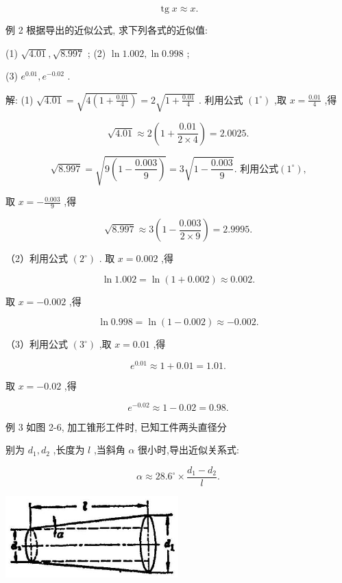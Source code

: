 \documentclass[10pt]{article}
\begin{document}
\[
\operatorname{tg}x \approx x\text{.}
\]

例 2 根据导出的近似公式, 求下列各式的近似值:

(1) \(\sqrt{4.01},\sqrt{8.997}\) ; (2) \(\ln {1.002},\ln {0.998}\) ;

(3) \({e}^{0.01},{e}^{-{0.02}}\) .

解: (1) \(\sqrt{4.01} = \sqrt{4\left( {1 + \frac{0.01}{4}}\right) } = 2\sqrt{1 + \frac{0.01}{4}}\) . 利用公式 \(\left( {1}^{ \circ }\right)\) ,取 \(x = \frac{0.01}{4}\) ,得

\[
\sqrt{4.01} \approx 2\left( {1 + \frac{0.01}{2 \times 4}}\right) = {2.0025}.
\]

\[
\sqrt{8.997} = \sqrt{9\left( {1 - \frac{0.003}{9}}\right) } = 3\sqrt{1 - \frac{0.003}{9}}\text{. 利用公式}\left( {1}^{ \circ }\right) \text{,}
\]

取 \(x = - \frac{0.003}{9}\) ,得

\[
\sqrt{8.997} \approx 3\left( {1 - \frac{0.003}{2 \times 9}}\right) = {2.9995}.
\]

（2）利用公式 \(\left( {2}^{ \circ }\right)\) . 取 \(x = {0.002}\) ,得

\[
\ln {1.002} = \ln \left( {1 + {0.002}}\right) \approx {0.002}\text{.}
\]

取 \(x = - {0.002}\) ,得

\[
\ln {0.998} = \ln \left( {1 - {0.002}}\right) \approx - {0.002}.
\]

（3）利用公式 \(\left( {3}^{ \circ }\right)\) ,取 \(x = {0.01}\) ,得

\[
{e}^{0.01} \approx 1 + {0.01} = {1.01}.
\]

取 \(x = - {0.02}\) ,得

\[
{e}^{-{0.02}} \approx 1 - {0.02} = {0.98}.
\]

例 3 如图 2-6, 加工锥形工件时, 已知工件两头直径分

别为 \({d}_{1},{d}_{2}\) ,长度为 \(l\) ,当斜角 \(\alpha\) 很小时,导出近似关系式:

\[
\alpha \approx {28.6}^{ \circ } \times \frac{{d}_{1} - {d}_{2}}{l}.
\]

\begin{center}
\includegraphics[max width=0.5\textwidth]{images/01912c18-5c3f-733d-b775-749ba9897a9d_120_883650.jpg}
\end{center}
\end{document}
